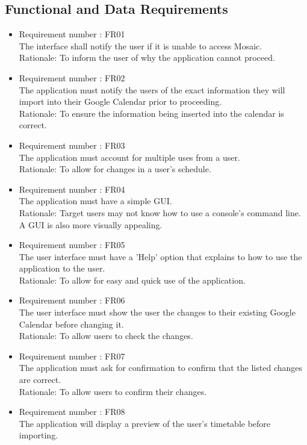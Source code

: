 \documentclass[12pt, titlepage]{article}
\begin{document}
\subsection{Functional and Data Requirements}
\begin{itemize}
\item Requirement number : FR01\\
The interface shall notify the user if it is unable to access Mosaic.\\
Rationale: To inform the user of why the application cannot proceed.
\item Requirement number : FR02\\
The application must notify the users of the exact information they will import into their Google Calendar prior to proceeding.\\
Rationale: To ensure the information being inserted into the calendar is correct.
\item Requirement number : FR03\\
The application must account for multiple uses from a user. \\
Rationale: To allow for changes in a user’s schedule.
\item Requirement number : FR04\\
The application must have a simple GUI. \\
Rationale: Target users may not know how to use a console’s command line. A GUI is also more visually appealing.
\item Requirement number : FR05\\
The user interface must have a 'Help' option that explains to how to use the application to the user.\\
Rationale: To allow for easy and quick use of the application.
\item Requirement number : FR06\\
The user interface must show the user  the changes to their existing Google Calendar before changing it. \\
Rationale: To allow users to check the changes.
\item Requirement number : FR07\\
The application must ask for confirmation to confirm that the listed changes are correct. \\
Rationale: To allow users to confirm their changes.
\item Requirement number : FR08\\
The application will display a preview of the user's timetable before importing.\\

\end{itemize}
\end{document}

